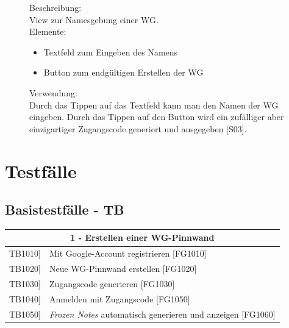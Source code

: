 \documentclass[a4paper]{scrreprt}
\begin{document}
\begin{figure}[h!]
\begin{minipage}[t]{0.55\linewidth}
    			Beschreibung: \\
    			View zur Namesgebung einer WG.
    			\\
    			Elemente:
    			\begin{itemize}
    				\renewcommand\labelitemi{--}
    				\item Textfeld zum Eingeben des Namens
    				\item Button zum endgültigen Erstellen der WG
    				
    			\end{itemize}
    			
    			Verwendung:\\
    			Durch das Tippen auf das Textfeld kann man
    			den Namen der WG eingeben.
    			Durch das Tippen auf den Button wird ein 
    			zufälliger aber einzigartiger Zugangscode 
    			generiert und ausgegeben {[}S03{]}.
    			
    			
    			
    		\end{minipage}
    	\end{figure}

    \chapter{Testfälle}
    
    	\section{Basistestfälle - TB}    
	    \begin{table}[h!]
	    	\centering
	    	\label{my-label}
	    	\begin{tabular}{p{2cm}p{12cm}}
	    		
	    		\multicolumn{2}{c}{\textbf{1 - Erstellen einer WG-Pinnwand}} \\ \hline
	    		\centering{[}TB1010{]} & Mit Google-Account registrieren {[}FG1010{]}\\
	    		\centering{[}TB1020{]}& Neue WG-Pinnwand erstellen {[}FG1020{]}                                \\
	    		\centering{[}TB1030{]}& Zugangscode generieren {[}FG1030{]}\\ 
	    		\centering{[}TB1040{]}& Anmelden mit Zugangscode {[}FG1050{]}\\ 
	    		\centering{[}TB1050{]}& \textit{Frozen Notes} automatisch generieren und anzeigen {[}FG1060{]}\\ 
	    		\hline
	    	\end{tabular}
	    \end{table}
	    
\end{document}
